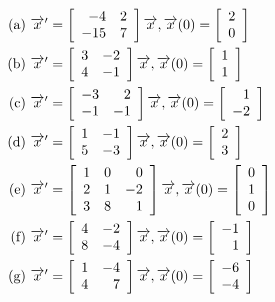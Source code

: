 \documentclass[11pt]{article}
\begin{document}
$$\begin{aligned}
\text{(a)  } & \overrightarrow{x}' = 
\left[\begin{array}{rr}
-4 & 2 \\
-15 & 7 \end{array}\right]\overrightarrow{x}, \overrightarrow{x}(0) = \left[\begin{array}{r}
 2 \\
 0 \end{array}\right]\\
\text{(b)  } & \overrightarrow{x}' = 
\left[\begin{array}{rr}
 3 & -2 \\
 4 & -1 \end{array}\right]\overrightarrow{x}, \overrightarrow{x}(0) = \left[\begin{array}{r}
 1 \\
 1 \end{array}\right]\\
\text{(c)  } & \overrightarrow{x}' = 
\left[\begin{array}{rr}
 -3 & 2 \\
 -1 & -1 \end{array}\right]\overrightarrow{x}, \overrightarrow{x}(0) = \left[\begin{array}{r}
 1 \\
 -2 \end{array}\right]\\
\text{(d)  } & \overrightarrow{x}' = 
\left[\begin{array}{rr}
 1 & -1 \\
 5 & -3 \end{array}\right]\overrightarrow{x}, \overrightarrow{x}(0) = \left[\begin{array}{r}
 2 \\
 3 \end{array}\right]\\
\text{(e)  } & \overrightarrow{x}' = 
\left[\begin{array}{rrr}
 1 & 0 & 0\\
 2 & 1 & -2\\
 3 & 8 & 1\end{array}\right]\overrightarrow{x}, \overrightarrow{x}(0) = \left[\begin{array}{r}
 0 \\
 1 \\
 0
 \end{array}\right]\\
\text{(f)  } & \overrightarrow{x}' = 
\left[\begin{array}{rr}
 4 & -2 \\
 8 & -4 \end{array}\right]\overrightarrow{x}, \overrightarrow{x}(0) = \left[\begin{array}{r}
 -1 \\
 1 \end{array}\right]\\
\text{(g)  } & \overrightarrow{x}' = 
\left[\begin{array}{rr}
 1 & -4 \\
 4 & 7 \end{array}\right]\overrightarrow{x}, \overrightarrow{x}(0) = \left[\begin{array}{r}
 -6 \\
 -4 \end{array}\right]\\
\end{aligned}$$
\end{document}
